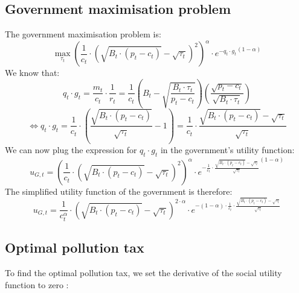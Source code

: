 \documentclass{article}
\begin{document}
\subsection{Government maximisation problem}
\label{sec:proof6}
The government maximisation problem is:
$$\max_{\tau_{t}}{\left(\frac{1}{c_{t}}\cdot\left({\sqrt{B_{t}\cdot (p_{t}-c_{t})}-\sqrt{\tau_{t}}}\right)^{2}\right)^{\alpha}\cdot {e^{-q_{t}\cdot g_{t}}}^{(1-\alpha)}}$$
We know that:
$$q_{t}\cdot g_{t}=\frac{m_{t}}{c_{t}}\cdot\frac{1}{r_{t}}=\frac{1}{c_{t}}\left(B_{t}-\sqrt{\frac{B_{t}\cdot \tau_{t}}{p_{t}-c_{t}}}\right)\left(\frac{\sqrt{p_{t}-c_{t}}}{\sqrt{B_{t}\cdot \tau_{t}}}\right)$$
$$\Leftrightarrow{q_{t}}\cdot g_{t}=\frac{1}{c_{t}}\cdot \left(\frac{\sqrt{B_{t}\cdot(p_{t}-c_{t})}}{\sqrt{\tau_{t}}}-1\right)=\frac{1}{c_{t}}\cdot \frac{\sqrt{B_{t}\cdot(p_{t}-c_{t})}-\sqrt{\tau_{t}}}{\sqrt{\tau_{t}}}$$
We can now plug the expression for $q_{t}\cdot g_{t}$ in the government's utility function:
$${u_{G,t}=\left(\frac{1}{c_{t}}\cdot\left({\sqrt{B_{t}\cdot (p_{t}-c_{t})}-\sqrt{\tau_{t}}}\right)^{2}\right)^{\alpha}\cdot {e^{-\frac{1}{c_{t}}\cdot \frac{\sqrt{B_{t}\cdot(p_{t}-c_{t})}-\sqrt{\tau_{t}}}{\sqrt{\tau_{t}}}}}^{(1-\alpha)}}$$
The simplified utility function of the government is therefore:
$${u_{G,t}=\frac{1}{c_{t}^\alpha}\cdot\left({\sqrt{B_{t}\cdot (p_{t}-c_{t})}-\sqrt{\tau_{t}}}\right)^{2\cdot\alpha}\cdot {e^{-(1-\alpha)\cdot\frac{1}{c_{t}}\cdot \frac{\sqrt{B_{t}\cdot(p_{t}-c_{t})}-\sqrt{\tau_{t}}}{\sqrt{\tau_{t}}}}}}$$

\subsection{Optimal pollution tax}
\label{sec:proof7}

To find the optimal pollution tax, we set the derivative of the social utility function to zero : 
\end{document}
